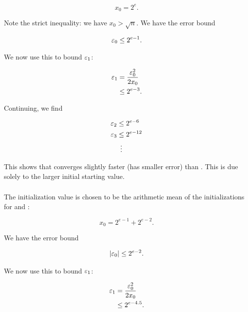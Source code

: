 \begin{equation}
    x_{0} = 2^{e}.
\end{equation}

\noindent
Note the strict inequality: we have $x_{0} > \sqrt{n}$.
We have the error bound

\begin{equation}
    \varepsilon_{0} \le 2^{e-1}.
\end{equation}

\noindent
We now use this to bound $\varepsilon_{1}$:

\begin{align}
    \varepsilon_{1} &= \frac{\varepsilon_{0}^{2}}{2x_{0}} \nonumber\\
        &\le 2^{e-3}.
\end{align}

\noindent
Continuing, we find

\begin{align}
    \varepsilon_{2} &\le 2^{e-6} \nonumber\\
    \varepsilon_{3} &\le 2^{e-12} \nonumber\\
        &\ \vdots
\end{align}

\noindent
This shows that \UnrolledTwo{} converges slightly faster (has smaller error)
than \UnrolledOne{}.
This is due solely to the larger initial starting value.


\subsubsection{\UnrolledThree{}}
\label{app:error_bounds:unrolled3}

The initialization value is chosen to be the arithmetic mean
of the initializations for \UnrolledOne{} and \UnrolledTwo{}:

\begin{equation}
    x_{0} = 2^{e-1} + 2^{e-2}.
\end{equation}

\noindent
We have the error bound

\begin{equation}
    \left| \varepsilon_{0} \right| \le 2^{e-2}.
\end{equation}

\noindent
We now use this to bound $\varepsilon_{1}$:

\begin{align}
    \varepsilon_{1} &= \frac{\varepsilon_{0}^{2}}{2x_{0}} \nonumber\\
        &\le 2^{e-4.5}.
\end{align}

